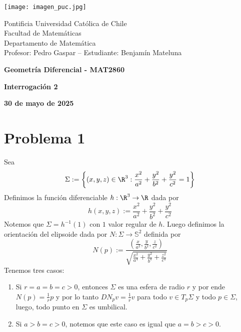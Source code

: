 \documentclass{article}
\begin{document}
\begin{minipage}{2.5cm}
    \texttt{[image: imagen\_puc.jpg]}
\end{minipage}
\begin{minipage}{14cm}
    {\sc Pontificia Universidad Católica de Chile\\
    Facultad de Matemáticas\\
    Departamento de Matemática\\
    Profesor: Pedro Gaspar -- Estudiante: Benjamín Mateluna}
\end{minipage}
\vspace{1ex}

{\centerline{\bf Geometría Diferencial - MAT2860}
\centerline{\bf Interrogación 2}}
\centerline{\bf 30 de mayo de 2025}

\section*{Problema 1}
\noindent Sea
\begin{equation*}
    \Sigma:=\left\{(x,y,z)\in\R^{3}:\frac{x^{2}}{a^{2}}+\frac{y^{2}}{b^{2}}+\frac{y^{2}}{c^{2}}
    =1\right\}
\end{equation*} 
Definimos la función diferenciable $h:\R^{3}\to\R$ dada por
\begin{equation*}
    h(x,y,z):=\frac{x^{2}}{a^{2}}+\frac{y^{2}}{b^{2}}+\frac{y^{2}}{c^{2}}
\end{equation*}
Notemos que $\Sigma=h^{-1}(1)$ con $1$ valor regular de $h$. Luego definimos la orientación 
del elipsoide dada por $N:\Sigma\to\mathbb{S}^{2}$ definida por
\begin{equation*}
    N(p):=\frac{\left(\frac{x}{a^{2}},\frac{y}{b^{2}},\frac{z}{c^{2}}\right)}
    {\sqrt{\frac{x^{2}}{a^{4}}+\frac{y^{2}}{b^{4}}+\frac{z^{2}}{c^{4}}}}
\end{equation*}
Tenemos tres casos:
\begin{enumerate}
    \item Si $r=a=b=c>0$, entonces $\Sigma$ es una esfera de radio $r$ y por ende 
    $N(p)=\frac{1}{r}p$ y por lo tanto $DN_{p}v=\frac{1}{r}v$ para todo $v\in T_{p}\Sigma$ y todo 
    $p\in\Sigma$, luego, todo punto en $\Sigma$ es umbilical.

    \item Si $a>b=c>0$, notemos que este caso es igual que $a=b>c>0$.
\end{enumerate}
\end{document}
